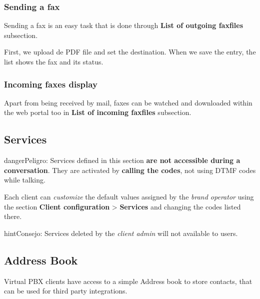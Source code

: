 \documentclass[letterpaper,10pt,spanish]{sphinxmanual}
\begin{document}
\subsubsection{Sending a fax}
\label{administration_portal/client/vpbx/faxes:sending-a-fax}
Sending a fax is an easy task that is done through \textbf{List of outgoing faxfiles} subsection.

First, we upload de PDF file and set the destination. When we save the entry, the list shows the fax and its status.


\subsubsection{Incoming faxes display}
\label{administration_portal/client/vpbx/faxes:incoming-faxes-display}
Apart from being received by mail, faxes can be watched and downloaded within
the web portal too in \textbf{List of incoming faxfiles} subsection.


\subsection{Services}
\label{administration_portal/client/vpbx/services:services}\label{administration_portal/client/vpbx/services:client-services}\label{administration_portal/client/vpbx/services::doc}
\begin{notice}{danger}{Peligro:}
Services defined in this section \textbf{are not accessible during a
conversation}. They are activated by \textbf{calling the codes}, not using
DTMF codes while talking.
\end{notice}

Each client can \emph{customize} the default values assigned by the \emph{brand operator}
using the section \textbf{Client configuration} \textgreater{} \textbf{Services} and changing the codes
listed there.

\begin{notice}{hint}{Consejo:}
Services deleted by the \emph{client admin} will not available to users.
\end{notice}


\subsection{Address Book}
\label{administration_portal/client/vpbx/addressbook:address-book}\label{administration_portal/client/vpbx/addressbook::doc}
Virtual PBX clients have access to a simple Address book to store contacts,
that can be used for third party integrations.
\end{document}
